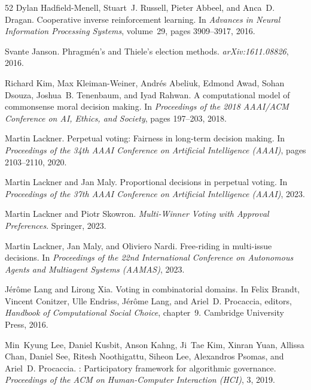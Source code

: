 \documentclass[10pt]{scrartcl}
\theoremstyle{plain}
\theoremstyle{definition}
\begin{document}
\begin{thebibliography}{52}
	Dylan Hadfield-Menell, Stuart~J. Russell, Pieter Abbeel, and Anca~D. Dragan.
	\newblock Cooperative inverse reinforcement learning.
	\newblock In \emph{Advances in Neural Information Processing Systems},
	volume~29, pages 3909--3917, 2016.
	
	Svante Janson.
	\newblock Phragm{\'e}n's and {T}hiele's election methods.
	\newblock \emph{arXiv:1611.08826}, 2016.
	
	Richard Kim, Max Kleiman-Weiner, Andr{\'e}s Abeliuk, Edmond Awad, Sohan Dsouza,
	Joshua~B. Tenenbaum, and Iyad Rahwan.
	\newblock A computational model of commonsense moral decision making.
	\newblock In \emph{Proceedings of the 2018 AAAI/ACM Conference on AI, Ethics,
		and Society}, pages 197--203, 2018.
	
	Martin Lackner.
	\newblock Perpetual voting: Fairness in long-term decision making.
	\newblock In \emph{Proceedings of the 34th AAAI Conference on Artificial
		Intelligence (AAAI)}, pages 2103--2110, 2020.
	
	Martin Lackner and Jan Maly.
	\newblock Proportional decisions in perpetual voting.
	\newblock In \emph{Proceedings of the 37th AAAI Conference on Artificial
		Intelligence (AAAI)}, 2023.
	
	Martin Lackner and Piotr Skowron.
	\newblock \emph{Multi-Winner Voting with Approval Preferences}.
	\newblock Springer, 2023.
	
	Martin Lackner, Jan Maly, and Oliviero Nardi.
	\newblock Free-riding in multi-issue decisions.
	\newblock In \emph{Proceedings of the 22nd International Conference on
		Autonomous Agents and Multiagent Systems (AAMAS)}, 2023.
	
	J{\'e}r{\^o}me Lang and Lirong Xia.
	\newblock Voting in combinatorial domains.
	\newblock In Felix Brandt, Vincent Conitzer, Ulle Endriss, J{\'e}r{\^o}me Lang,
	and Ariel~D. Procaccia, editors, \emph{Handbook of Computational Social
		Choice}, chapter~9. Cambridge University Press, 2016.
	
	Min~Kyung Lee, Daniel Kusbit, Anson Kahng, Ji~Tae Kim, Xinran Yuan, Allissa
	Chan, Daniel See, Ritesh Noothigattu, Siheon Lee, Alexandros Psomas, and
	Ariel~D. Procaccia.
	: Participatory framework for algorithmic governance.
	\newblock \emph{Proceedings of the ACM on Human-Computer Interaction (HCI)}, 3,
	2019.
	

\end{thebibliography}
\end{document}
